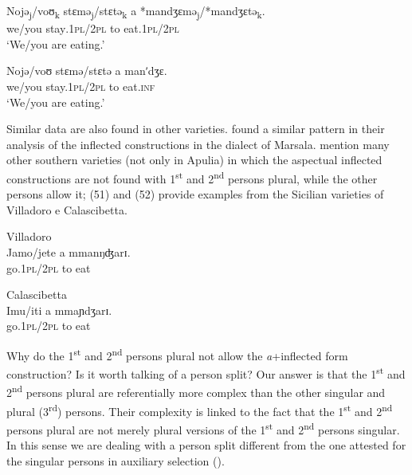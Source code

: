 \documentclass[output=paper]{langsci/langscibook}
\begin{document}
\ea%
    \label{ex:lorusso:50}
    \gll Nojə\textsubscript{j}/voʊ\textsubscript{k}   stɛmə\textsubscript{j}/stɛtə\textsubscript{k}   a       *mandʒɛmə\textsubscript{j}/*mandʒɛtə\textsubscript{k}.\\
         we/you  stay\textsc{.1pl/2pl}  to   eat.\textsc{1pl/2pl}\\
    \glt ‘We/you are eating.’
\z


\ea%
    \label{ex:lorusso:51}
    \gll Nojə/voʊ   stɛmə/stɛtə  a   manʹdʒɛ.\\
         we/you  stay.\textsc{1pl/2pl}  to   eat\textsc{.inf}\\
    \glt ‘We/you are eating.’
\z


Similar data are also found in other varieties. \citet{Cardinaletti2003} found a similar pattern in their analysis of the inflected constructions in the dialect of Marsala. \citet{Manzini2005} mention many other southern varieties (not only in Apulia) in which the aspectual inflected constructions are not found with 1\textsuperscript{st} and 2\textsuperscript{nd} persons plural, while the other persons allow it; (51) and (52) provide examples from the Sicilian varieties of Villadoro e Calascibetta.

\ea%
         Villadoro\label{ex:lorusso:52}\\
    \gll Jamo/jete   a   mmanŋʤarɪ.\\
         go.\textsc{1pl/2pl}   to  eat \\
    \z


\ea%
         Calascibetta\label{ex:lorusso:53}\\
    \gll Imu/iti   a  mmaɲdʒarɪ.  \\
         go.\textsc{1pl/2pl} to  eat \\
    \z

Why do the 1\textsuperscript{st} and 2\textsuperscript{nd} persons plural not allow the \textit{a}+inflected form construction? Is it worth talking of a person split? Our answer is that the 1\textsuperscript{st} and 2\textsuperscript{nd} persons plural are referentially more complex than the other singular and plural (3\textsuperscript{rd}) persons. Their complexity is linked to the fact that the 1\textsuperscript{st} and 2\textsuperscript{nd} persons plural are not merely plural versions of the 1\textsuperscript{st} and 2\textsuperscript{nd} persons singular. In this sense we are dealing with a person split different from the one attested for the singular persons in auxiliary selection (\citealt{Manzini2005,Manzini2007,Manzini2011Bio}).
\end{document}

